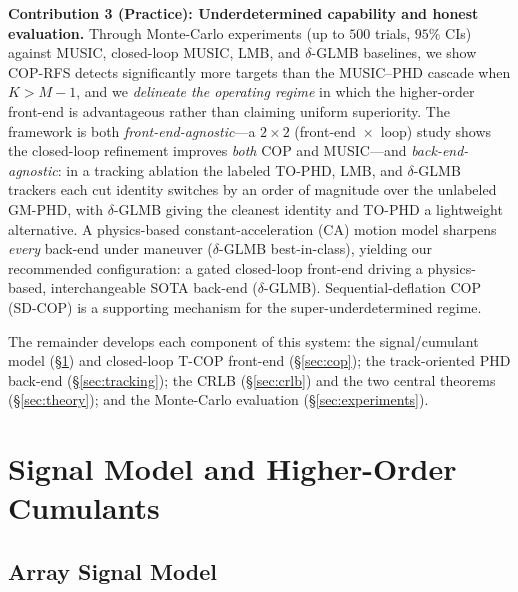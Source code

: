 \documentclass[journal]{IEEEtran}
\begin{document}
\textbf{Contribution 3 (Practice): Underdetermined capability and honest evaluation.}
Through Monte-Carlo experiments (up to $500$ trials, $95\%$ CIs) against MUSIC, closed-loop MUSIC, LMB, and $\delta$-GLMB baselines, we show COP-RFS detects significantly more targets than the MUSIC--PHD cascade when $K>M{-}1$, and we \emph{delineate the operating regime} in which the higher-order front-end is advantageous rather than claiming uniform superiority. The framework is both \emph{front-end-agnostic}---a $2\times2$ (front-end~$\times$~loop) study shows the closed-loop refinement improves \emph{both} COP and MUSIC---and \emph{back-end-agnostic}: in a tracking ablation the labeled TO-PHD, LMB, and $\delta$-GLMB trackers each cut identity switches by an order of magnitude over the unlabeled GM-PHD, with $\delta$-GLMB giving the cleanest identity and TO-PHD a lightweight alternative. A physics-based constant-acceleration (CA) motion model sharpens \emph{every} back-end under maneuver ($\delta$-GLMB best-in-class), yielding our recommended configuration: a gated closed-loop front-end driving a physics-based, interchangeable SOTA back-end ($\delta$-GLMB). Sequential-deflation COP (SD-COP) is a supporting mechanism for the super-underdetermined regime.

The remainder develops each component of this system: the signal/cumulant model (\S\ref{sec:signal_model}) and closed-loop T-COP front-end (\S\ref{sec:cop}); the track-oriented PHD back-end (\S\ref{sec:tracking}); the CRLB (\S\ref{sec:crlb}) and the two central theorems (\S\ref{sec:theory}); and the Monte-Carlo evaluation (\S\ref{sec:experiments}).

\section{Signal Model and Higher-Order Cumulants}
\label{sec:signal_model}

\subsection{Array Signal Model}
\end{document}
